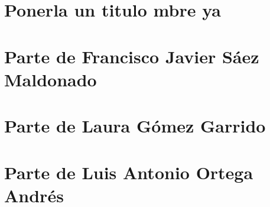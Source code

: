 \documentclass[11pt]{article}
\begin{document}
\section{Ponerla un titulo mbre ya}

\section{Parte de Francisco Javier Sáez Maldonado}

 \newpage

\section{Parte de Laura Gómez Garrido} 

 \newpage

\section{Parte de Luis Antonio Ortega Andrés}

 \newpage
 \newpage
 \newpage
 \newpage
 \newpage
 \newpage
\end{document}

